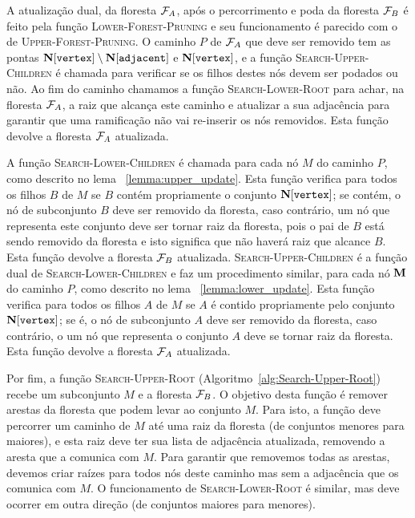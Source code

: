 A atualização dual, da floresta $\mathcal{F}_A$, após o percorrimento e 
poda da floresta $\mathcal{F}_B$ é feito pela função 
\textsc{Lower-Forest-Pruning} e seu funcionamento é parecido com o de
\textsc{Upper-Forest-Pruning}. O caminho $P$ de $\mathcal{F}_A$ que deve 
ser removido tem as pontas 
$\mathbf N[\texttt{vertex}] \setminus \mathbf N[\texttt{adjacent}]$
e $\mathbf N[\texttt{vertex}]$, e a função 
\textsc{Search-Upper-Children} é chamada para verificar se os filhos 
destes nós devem ser podados ou não. Ao fim do caminho chamamos a função 
\textsc{Search-Lower-Root} para achar, na floresta $\mathcal{F}_A$, a raiz
que alcança este caminho e atualizar a sua adjacência para garantir que 
uma ramificação não vai re-inserir os nós removidos. Esta função devolve 
a floresta $\mathcal{F}_A$ atualizada.

A função \textsc{Search-Lower-Children} é chamada para cada nó $M$ do 
caminho $P$, como descrito no lema ~\ref{lemma:upper_update}. Esta 
função verifica para todos os filhos $B$ de $M$ se $B$ contém 
propriamente o conjunto $\mathbf N[\texttt{vertex}]$; se contém, o 
nó de subconjunto $B$ deve ser removido da floresta, caso 
contrário, um nó que representa este conjunto deve ser tornar raiz da 
floresta, pois o pai de $B$ está sendo removido da floresta e isto 
significa que não haverá raiz que alcance $B$. Esta função
devolve a floresta $\mathcal{F}_B$ atualizada. \textsc{Search-Upper-Children} é a função dual de 
\textsc{Search-Lower-Children} e faz um procedimento similar, para 
cada nó $\mathbf M$ do caminho $P$, como descrito no lema 
~\ref{lemma:lower_update}. Esta função verifica para todos os filhos $A$
de $M$ se $A$ é contido propriamente pelo conjunto 
$\mathbf N[\texttt{vertex}]$; se é, o nó de subconjunto $A$ deve ser 
removido da floresta, caso contrário, o um nó que representa o conjunto 
$A$ deve se tornar raiz da floresta. Esta função devolve a floresta 
$\mathcal{F}_A$ atualizada.


Por fim, a função \textsc{Search-Upper-Root} (Algoritmo~\ref{alg:Search-Upper-Root}) recebe um subconjunto $M$ e a 
floresta $\mathcal{F}_B$. O objetivo desta função é remover arestas da 
floresta que podem levar ao conjunto $M$. Para isto, a função deve 
percorrer um caminho de $M$ até uma raiz da floresta (de conjuntos 
menores para maiores), e esta raiz deve ter sua lista de adjacência 
atualizada, removendo a aresta que a comunica com $M$. Para garantir que 
removemos todas as arestas, devemos criar raízes para todos nós deste 
caminho mas sem a adjacência que os comunica com $M$. O funcionamento de 
\textsc{Search-Lower-Root} é similar, mas deve ocorrer em outra direção
(de conjuntos maiores para menores).

